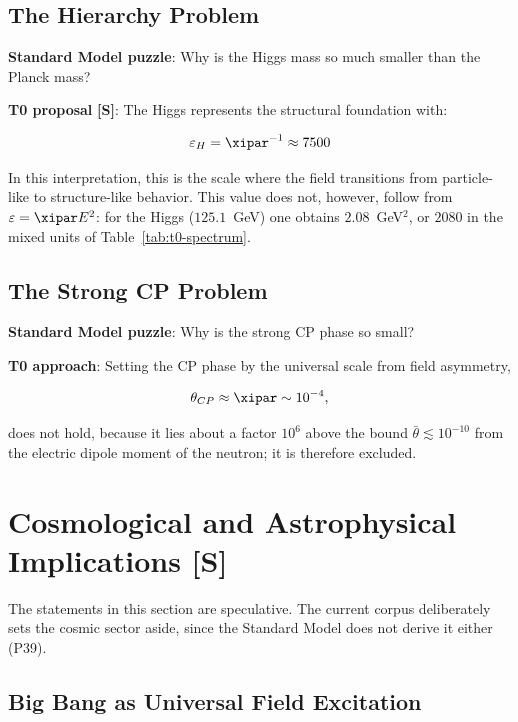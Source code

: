 	\subsection{The Hierarchy Problem}
	
	\textbf{Standard Model puzzle}: Why is the Higgs mass so much smaller than the Planck mass?
	
	\textbf{T0 proposal} \textbf{[S]}: The Higgs represents the structural foundation with:
	
	\begin{equation}
		\varepsilon_H = \xipar^{-1} \approx 7500
		\label{eq:higgs_epsilon}
	\end{equation}
	
	In this interpretation, this is the scale where the field transitions from particle-like to structure-like behavior. This value does not, however, follow from $\varepsilon = \xipar E^2$: for the Higgs ($125.1$~GeV) one obtains $2.08$~GeV$^2$, or $2080$ in the mixed units of Table~\ref{tab:t0-spectrum}.
	
	\subsection{The Strong CP Problem}
	
	\textbf{Standard Model puzzle}: Why is the strong CP phase so small?
	
	\textbf{T0 approach}: Setting the CP phase by the universal scale from field asymmetry,
	
	\begin{equation}
		\theta_{CP} \approx \xipar \sim 10^{-4},
		\label{eq:cp_phase}
	\end{equation}
	
	does not hold, because it lies about a factor $10^6$ above the bound $\bar\theta \lesssim 10^{-10}$ from the electric dipole moment of the neutron; it is therefore excluded.
	
	\section{Cosmological and Astrophysical Implications [S]}

	The statements in this section are speculative. The current corpus deliberately sets the cosmic sector aside, since the Standard Model does not derive it either (P39).
	
	\subsection{Big Bang as Universal Field Excitation}
	
